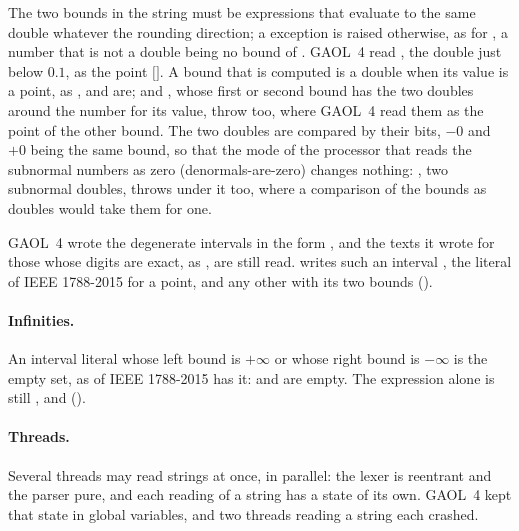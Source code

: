 The two bounds in the string  must be expressions that
evaluate to the same double whatever the rounding direction; a
 exception is raised otherwise, as for
, a number that is not a double being no bound of
.\newinvfive{} GAOL~4 read
, the double just below $0.1$, as the
point $[$$]$. A bound that is computed is a
double when its value is a point, as ,  and
\code{[0.5]} are;  and
, whose first or second bound has the two
doubles around the number for its value, throw 
too, where GAOL~4 read them as the point of the other bound.\newinvfive{}
The two doubles are compared by their bits, $-0$ and $+0$ being the same
bound, so that the mode of the processor that reads the subnormal numbers
as zero (denormals-are-zero) changes nothing: ,
two subnormal doubles, throws under it too, where a comparison of the bounds as
doubles would take them for one.\newinvfive

\begin{Rem}
GAOL~4 wrote the degenerate intervals in the form , and the
texts it wrote for those whose digits are exact, as , are still
read.  writes such an interval \code{[a]}, the literal of
IEEE 1788-2015 for a point, and any other with its two bounds
().
\end{Rem}

\paragraph{Infinities.} An interval literal whose left bound is $+\infty$ or
whose right bound is $-\infty$ is the empty set, as  of
IEEE 1788-2015 has it:  and  are
empty.\newinvfive{} The expression  alone is still
, and  
().

\paragraph{Threads.} Several threads may read strings at once, in parallel:
the lexer is reentrant and the parser pure, and each reading of a string has
a state of its own.\newinvfive{} GAOL~4 kept that state in global variables,
and two threads reading a string each crashed.

